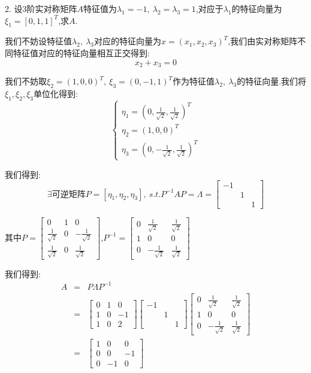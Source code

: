 2. 设$3$阶实对称矩阵$A$特征值为$\lambda_{1}=-1,\ \lambda_{2}=\lambda_{3}=1$,对应于$\lambda_{1}$的特征向量为$\xi_{1}=[0,1,1]^{T}$,求$A$.
\begin{solution}
	
	我们不妨设特征值$\lambda_{2},\ \lambda_{3}$对应的特征向量为$x=(x_{1},x_{2},x_{3})^T$,我们由实对称矩阵不同特征值对应的特征向量相互正交得到: 
	$$x_{2}+x_{3}=0$$
	
	我们不妨取$\xi_{2}=(1,0,0)^T,\ \xi_{3}=(0,-1,1)^T$作为特征值$\lambda_{2},\ \lambda_{3}$的特征向量.我们将$\xi_{1},\xi_{2},\xi_{3}$单位化得到: 
	$$\left\lbrace
	\begin{array}{l}
		\eta_{1}=(0,\frac{1}{\sqrt{2}},\frac{1}{\sqrt{2}})^T\\
		\eta_{2}=(1,0,0)^T\\
		\eta_{3}=(0,-\frac{1}{\sqrt{2}},\frac{1}{\sqrt{2}})^T
	\end{array}
	\right. $$
	
	我们得到: $$\exists \text{可逆矩阵}P=[\eta_{1},\eta_{2},\eta_{3}
	],\ s.t. P^{-1}AP=\varLambda=\left[ \begin{matrix}
		-1& & \\ &1& \\ & &1
	\end{matrix}\right]$$
	
	其中$P=\left[ \begin{matrix}
		0&1&0\\ \frac{1}{\sqrt{2}}&0&-\frac{1}{\sqrt{2}} \\\frac{1}{\sqrt{2}}&0&\frac{1}{\sqrt{2}}
	\end{matrix}\right]$,$P^{-1}=\left[ \begin{matrix}
		0&\frac{1}{\sqrt{2}}&\frac{1}{\sqrt{2}}\\ 1&0&0 \\0&-\frac{1}{\sqrt{2}}&\frac{1}{\sqrt{2}}
	\end{matrix}\right]$
	
	我们得到: 
	\begin{eqnarray*}
		A&=&P\varLambda P^{-1}\\
		&=&\left[ \begin{matrix}
			0&1&0\\ 1&0&-1 \\1&0&2
		\end{matrix}\right]\left[ \begin{matrix}
			-1& & \\ &1& \\ & &1
		\end{matrix}\right]\left[ \begin{matrix}
			0&\frac{1}{\sqrt{2}}&\frac{1}{\sqrt{2}}\\ 1&0&0 \\0&-\frac{1}{\sqrt{2}}&\frac{1}{\sqrt{2}}
		\end{matrix}\right]\\
		&=&\left[ \begin{matrix}
			1&0&0\\ 0&0&-1 \\0&-1&0
		\end{matrix}\right]
	\end{eqnarray*}
\end{solution}


